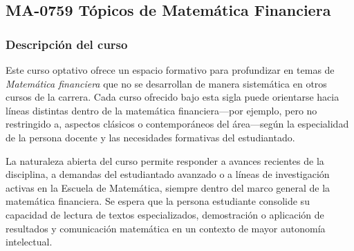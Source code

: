\newpage
\subsection*{MA-0759 Tópicos de Matemática Financiera}

\hypertarget{MA0759}{}
\begin{refsection}
\begin{table}[H]
\end{table}

\subsubsection*{Descripción del curso}

Este curso optativo ofrece un espacio formativo para profundizar en temas de \emph{Matemática financiera} que no se desarrollan de manera sistemática en otros cursos de la carrera. Cada curso ofrecido bajo esta sigla puede orientarse hacia líneas distintas dentro de la matemática financiera---por ejemplo, pero no restringido a, aspectos clásicos o contemporáneos del área---según la especialidad de la persona docente y las necesidades formativas del estudiantado.

La naturaleza abierta del curso permite responder a avances recientes de la disciplina, a demandas del estudiantado avanzado o a líneas de investigación activas en la Escuela de Matemática, siempre dentro del marco general de la matemática financiera. Se espera que la persona estudiante consolide su capacidad de lectura de textos especializados, demostración o aplicación de resultados y comunicación matemática en un contexto de mayor autonomía intelectual.


\end{refsection}
